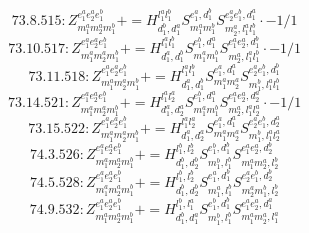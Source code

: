 \documentclass[letterpaper,10pt,fleqn,leqno,onecolumn]{article}
\begin{document}
\begin{equation} \;\;\;\;\;\;  73.8.515: Z^{e_{1}^{a}e_{2}^{a}e_{1}^{b}}_{m_{1}^{a}m_{2}^{a}m_{1}^{b}}+=H^{l_{1}^{a}l_{1}^{b}}_{d_{1}^{b},d_{1}^{a}}S^{e_{1}^{a},d_{1}^{b}}_{m_{1}^{a}m_{1}^{b}}S^{e_{2}^{a}e_{1}^{b},d_{1}^{a}}_{m_{2}^{a},l_{1}^{a}l_{1}^{b}}\cdot -1/1 \end{equation}
\begin{equation} \;\;\;\;\;\;  73.10.517: Z^{e_{1}^{a}e_{2}^{a}e_{1}^{b}}_{m_{1}^{a}m_{2}^{a}m_{1}^{b}}+=H^{l_{1}^{a}l_{1}^{b}}_{d_{1}^{a},d_{1}^{b}}S^{e_{1}^{b},d_{1}^{a}}_{m_{1}^{a}m_{1}^{b}}S^{e_{1}^{a}e_{2}^{a},d_{1}^{b}}_{m_{2}^{a},l_{1}^{a}l_{1}^{b}}\cdot -1/1 \end{equation}
\begin{equation} \;\;\;\;\;\;  73.11.518: Z^{e_{1}^{a}e_{2}^{a}e_{1}^{b}}_{m_{1}^{a}m_{2}^{a}m_{1}^{b}}+=H^{l_{1}^{a}l_{1}^{b}}_{d_{1}^{a},d_{1}^{b}}S^{e_{1}^{a},d_{1}^{a}}_{m_{1}^{a}m_{2}^{a}}S^{e_{2}^{a}e_{1}^{b},d_{1}^{b}}_{m_{1}^{b},l_{1}^{a}l_{1}^{b}} \end{equation}
\begin{equation} \;\;\;\;\;\;  73.14.521: Z^{e_{1}^{a}e_{2}^{a}e_{1}^{b}}_{m_{1}^{a}m_{2}^{a}m_{1}^{b}}+=H^{l_{1}^{a}l_{2}^{a}}_{d_{1}^{a},d_{2}^{a}}S^{e_{1}^{b},d_{1}^{a}}_{m_{1}^{a}m_{1}^{b}}S^{e_{1}^{a}e_{2}^{a},d_{2}^{a}}_{m_{2}^{a},l_{1}^{a}l_{2}^{a}}\cdot -1/1 \end{equation}
\begin{equation} \;\;\;\;\;\;  73.15.522: Z^{e_{1}^{a}e_{2}^{a}e_{1}^{b}}_{m_{1}^{a}m_{2}^{a}m_{1}^{b}}+=H^{l_{1}^{a}l_{2}^{a}}_{d_{1}^{a},d_{2}^{a}}S^{e_{1}^{a},d_{1}^{a}}_{m_{1}^{a}m_{2}^{a}}S^{e_{2}^{a}e_{1}^{b},d_{2}^{a}}_{m_{1}^{b},l_{1}^{a}l_{2}^{a}} \end{equation}
\begin{equation} \;\;\;\;\;\;  74.3.526: Z^{e_{1}^{a}e_{2}^{a}e_{1}^{b}}_{m_{1}^{a}m_{2}^{a}m_{1}^{b}}+=H^{l_{1}^{b},l_{2}^{b}}_{d_{1}^{b},d_{2}^{b}}S^{e_{1}^{b},d_{1}^{b}}_{m_{1}^{b},l_{1}^{b}}S^{e_{1}^{a}e_{2}^{a},d_{2}^{b}}_{m_{1}^{a}m_{2}^{a},l_{2}^{b}} \end{equation}
\begin{equation} \;\;\;\;\;\;  74.5.528: Z^{e_{1}^{a}e_{2}^{a}e_{1}^{b}}_{m_{1}^{a}m_{2}^{a}m_{1}^{b}}+=H^{l_{1}^{b},l_{2}^{b}}_{d_{1}^{b},d_{2}^{b}}S^{e_{1}^{a},d_{1}^{b}}_{m_{1}^{a},l_{1}^{b}}S^{e_{2}^{a}e_{1}^{b},d_{2}^{b}}_{m_{2}^{a}m_{1}^{b},l_{2}^{b}} \end{equation}
\begin{equation} \;\;\;\;\;\;  74.9.532: Z^{e_{1}^{a}e_{2}^{a}e_{1}^{b}}_{m_{1}^{a}m_{2}^{a}m_{1}^{b}}+=H^{l_{1}^{b},l_{1}^{a}}_{d_{1}^{b},d_{1}^{a}}S^{e_{1}^{b},d_{1}^{b}}_{m_{1}^{b},l_{1}^{b}}S^{e_{1}^{a}e_{2}^{a},d_{1}^{a}}_{m_{1}^{a}m_{2}^{a},l_{1}^{a}} \end{equation}
\end{document}
